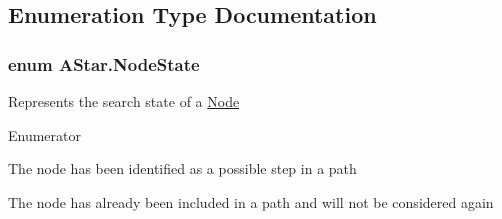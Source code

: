 \subsection{Enumeration Type Documentation}
\hypertarget{namespaceAStar_a44d96e2d4066e21483fa07d62358c358}{
\subsubsection[{Node\-State}]{\setlength{\rightskip}{0pt plus 5cm}enum {\bf A\-Star.\-Node\-State}}}\label{namespaceAStar_a44d96e2d4066e21483fa07d62358c358}


Represents the search state of a \hyperlink{classAStar_1_1Node}{Node} 

\begin{Desc}
\item[Enumerator]\par
\begin{description}
\item[{\em 
\hypertarget{namespaceAStar_a44d96e2d4066e21483fa07d62358c358ac3bf447eabe632720a3aa1a7ce401274}{Open}\label{namespaceAStar_a44d96e2d4066e21483fa07d62358c358ac3bf447eabe632720a3aa1a7ce401274}
}]The node has been identified as a possible step in a path \item[{\em 
\hypertarget{namespaceAStar_a44d96e2d4066e21483fa07d62358c358a03f4a47830f97377a35321051685071e}{Closed}\label{namespaceAStar_a44d96e2d4066e21483fa07d62358c358a03f4a47830f97377a35321051685071e}
}]The node has already been included in a path and will not be considered again \end{description}
\end{Desc}
